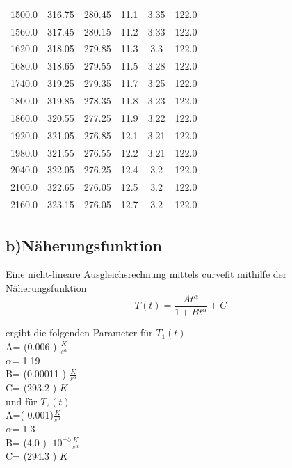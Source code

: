 \begin{table}
\begin{tabular}{cccccc}
1500.0 & 316.75 & 280.45 & 11.1 & 3.35 & 122.0 \\
1560.0 & 317.45 & 280.15 & 11.2 & 3.33 & 122.0 \\
1620.0 & 318.05 & 279.85 & 11.3 & 3.3 & 122.0 \\
1680.0 & 318.65 & 279.55 & 11.5 & 3.28 & 122.0 \\
1740.0 & 319.25 & 279.35 & 11.7 & 3.25 & 122.0 \\
1800.0 & 319.85 & 278.35 & 11.8 & 3.23 & 122.0 \\
1860.0 & 320.55 & 277.25 & 11.9 & 3.22 & 122.0 \\
1920.0 & 321.05 & 276.85 & 12.1 & 3.21 & 122.0 \\
1980.0 & 321.55 & 276.55 & 12.2 & 3.21 & 122.0 \\
2040.0 & 322.05 & 276.25 & 12.4 & 3.2 & 122.0 \\
2100.0 & 322.65 & 276.05 & 12.5 & 3.2 & 122.0 \\
2160.0 & 323.15 & 276.05 & 12.7 & 3.2 & 122.0 \\
\end{tabular}
\end{table}
\newpage
\subsection{b)Näherungsfunktion}
Eine nicht-lineare Ausgleichsrechnung mittels curvefit mithilfe der Näherungsfunktion
\begin{equation}
\label{eqn:naeherungsfunktion}
T(t)=\frac{At^\alpha}{1+Bt^\alpha}+C
\end{equation}

ergibt die folgenden Parameter
für $T_1(t)$\\

A= (0.006 ) $\frac{K}{s^\alpha}$ \\
$\alpha$= 1.19  \\
B= (0.00011 ) $\frac{K}{s^\alpha}$\\
C= (293.2 ) $K$ \\

und für $T_2(t)$\\

A=(-0.001)$\frac{K}{s^\alpha}$ \\
$\alpha$= 1.3  \\
B= (4.0 ) $\cdot 10^{-5}\frac{K}{s^\alpha}$\\
C= (294.3 ) $K$ \\

